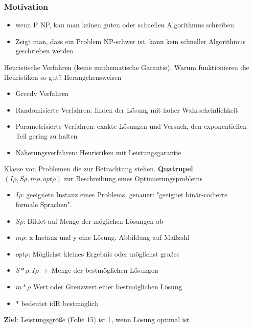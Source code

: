 \documentclass[a4paper,11pt]{article}
\begin{document}
\subsubsection*{Motivation}
\begin{itemize}
  \item wenn P \neq NP, kan man keinen guten oder schnellen Algorithmus schreiben
  \item Zeigt man, dass ein Problem NP-schwer ist, kann kein schneller Algorithmus geschrieben werden  
\end{itemize}
\Rightarrow Heuristische Verfahren (keine mathematische Garantie). Warum funktionieren die Heuristiken so gut? \n
Herangehensweisen
\begin{itemize}
  \item Greedy Verfahren
  \item Randomisierte Verfahren: finden der Lösung mit hoher Wahrscheinlichkeit
  \item Parametrisierte Verfahren: exakte Lösungen und Versuch, den exponentiellen Teil gering zu halten
  \item Näherungsverfahren: Heuristiken mit Leistungsgarantie
\end{itemize}
Klasse von Problemen die zur Betrachtung stehen. \n
\textbf{Quatrupel} $ (I\rho, S\rho, m\rho , opt\rho) $ zur Beschreibung eines Optimierungsproblems
\begin{itemize}
  \item $ I\rho $: geeignete Instanz eines Problems, genauer: "geeignet binär-codierte formale Sprachen".
  \item $ S\rho $: Bildet auf Menge der möglichen Lösungen ab
  \item $ m\rho $: x Instanz und y eine Lösung. Abbildung auf Maßzahl
  \item $ opt\rho $: Möglichst kleines Ergebnis oder möglichst großes
\end{itemize}
\begin{itemize}
  \item $ S*\rho: I\rho \rightarrow $ Menge der bestmöglichen Lösungen
  \item $ m*\rho $ Wert oder Grenzwert einer bestmöglichen Lösung
  \item * bedeutet idR bestmöglich
\end{itemize}
\Rightarrow \textbf{Ziel}: Leistungsgröße (Folie 15) ist 1, wenn Lösung optimal ist
\end{document}
